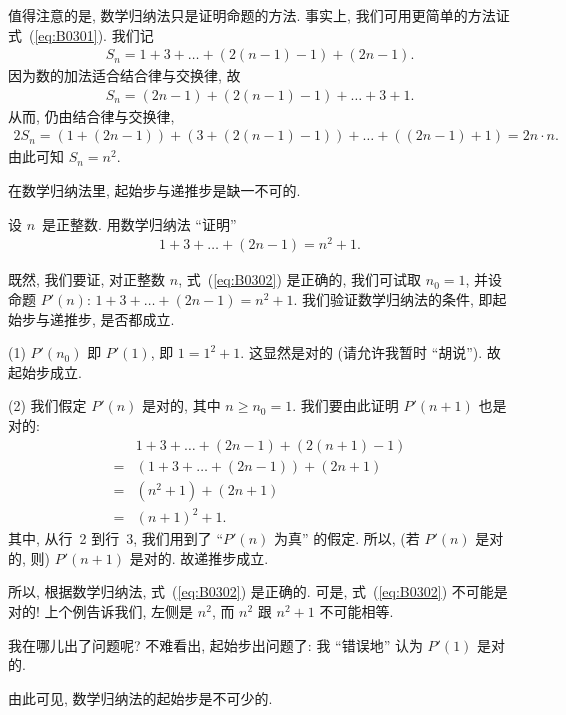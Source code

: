\documentclass[%
    UTF8,%
    fontset=none,%
    punct=kaiming,%
    zihao=-4,%
    a4paper,%
    oneside,%
]{ctexbook}
\let\emph\relax
\renewcommand*{\geq}{\geqslant}
\begin{document}
值得注意的是, 数学归纳法只是证明命题的\emph{一种}方法.
事实上, 我们可用更简单的方法证式~(\ref{eq:B0301}).
我们记
\begin{align*}
    S_n = 1 + 3 + \dots + (2(n-1) - 1) + (2n - 1).
\end{align*}
因为数的加法适合结合律与交换律, 故
\begin{align*}
    S_n = (2n - 1) + (2(n-1) - 1) + \dots + 3 + 1.
\end{align*}
从而, 仍由结合律与交换律,
\begin{align*}
    2S_n = (1 + (2n - 1)) + (3 + (2(n-1) - 1))
    + \dots + ((2n - 1) + 1) = 2n \cdot n.
\end{align*}
由此可知 \(S_n = n^2\).

\vspace{2ex}

在数学归纳法里, 起始步与递推步是缺一不可的.

\begin{example}[缺起始步]
    设 \(n\)~是正整数.
    用数学归纳法 ``证明''
    \begin{align}
        1 + 3 + \dots + (2n - 1) = n^2 + 1.
        \label{eq:B0302}
    \end{align}

    既然, 我们要证, 对正整数 \(n\),
    式~(\ref{eq:B0302}) 是正确的,
    我们可试取 \(n_0 = 1\),
    并设命题 \(P'(n)\): \(1 + 3 + \dots + (2n - 1) = n^2 + 1\).
    我们验证数学归纳法的条件,
    即起始步与递推步,
    是否都成立.

    (1)
    \(P'(n_0)\) 即 \(P'(1)\), 即 \(1 = 1^2 + 1\).
    这显然是对的
    (请允许我暂时 ``胡说'').
    故起始步成立.

    (2)
    我们假定 \(P'(n)\) 是对的, 其中 \(n \geq n_0 = 1\).
    我们要由此证明 \(P'(n+1)\) 也是对的:
    \begin{align*}
             & 1 + 3 + \dots + (2n - 1) + (2(n+1) - 1)
        \\
        = {} & (1 + 3 + \dots + (2n - 1)) + (2n + 1)
        \\
        = {} & (n^2 + 1) + (2n + 1)
        \\
        = {} & (n + 1)^2 + 1.
    \end{align*}
    其中, 从行~2 到行~3,
    我们用到了 ``\(P'(n)\) 为真'' 的假定.
    所以, (若 \(P'(n)\) 是对的, 则) \(P'(n+1)\) 是对的.
    故递推步成立.

    所以, 根据数学归纳法,
    式~(\ref{eq:B0302}) 是正确的.
    可是, 式~(\ref{eq:B0302}) 不可能是对的!
    上个例告诉我们, 左侧是 \(n^2\),
    而 \(n^2\) 跟 \(n^2 + 1\) 不可能相等.

    我在哪儿出了问题呢?
    不难看出, 起始步出问题了:
    我 ``错误地'' 认为 \(P'(1)\) 是对的.

    由此可见, 数学归纳法的起始步是不可少的.
\end{example}
\end{document}
